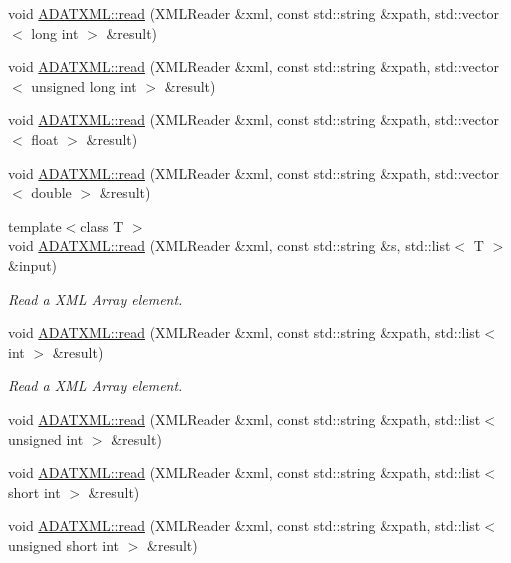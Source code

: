 \begin{DoxyCompactItemize}
\item 
void \mbox{\hyperlink{group__io_gaad4f8586d1c41ae7f0c32a40754623f5}{A\+D\+A\+T\+X\+M\+L\+::read}} (X\+M\+L\+Reader \&xml, const std\+::string \&xpath, std\+::vector$<$ long int $>$ \&result)
\item 
void \mbox{\hyperlink{group__io_ga04a1d8c6fa265cdf5824019b4f94844f}{A\+D\+A\+T\+X\+M\+L\+::read}} (X\+M\+L\+Reader \&xml, const std\+::string \&xpath, std\+::vector$<$ unsigned long int $>$ \&result)
\item 
void \mbox{\hyperlink{group__io_ga161a35ac40c7f85342a454fbc17e2dad}{A\+D\+A\+T\+X\+M\+L\+::read}} (X\+M\+L\+Reader \&xml, const std\+::string \&xpath, std\+::vector$<$ float $>$ \&result)
\item 
void \mbox{\hyperlink{group__io_ga49fa13abbc0b2a2273c58d328d1e7d70}{A\+D\+A\+T\+X\+M\+L\+::read}} (X\+M\+L\+Reader \&xml, const std\+::string \&xpath, std\+::vector$<$ double $>$ \&result)
\item 
{\footnotesize template$<$class T $>$ }\\void \mbox{\hyperlink{group__io_gacca340ef5b3a2ee3626cb544539f5e64}{A\+D\+A\+T\+X\+M\+L\+::read}} (X\+M\+L\+Reader \&xml, const std\+::string \&s, std\+::list$<$ T $>$ \&input)
\begin{DoxyCompactList}\small\item\em Read a X\+ML Array element. \end{DoxyCompactList}\item 
void \mbox{\hyperlink{group__io_gab7d805fe66e6e3f1f897d4dabd3b29ad}{A\+D\+A\+T\+X\+M\+L\+::read}} (X\+M\+L\+Reader \&xml, const std\+::string \&xpath, std\+::list$<$ int $>$ \&result)
\begin{DoxyCompactList}\small\item\em Read a X\+ML Array element. \end{DoxyCompactList}\item 
void \mbox{\hyperlink{group__io_gab76dffc06569f27474fb03e08b372393}{A\+D\+A\+T\+X\+M\+L\+::read}} (X\+M\+L\+Reader \&xml, const std\+::string \&xpath, std\+::list$<$ unsigned int $>$ \&result)
\item 
void \mbox{\hyperlink{group__io_gaf316ff420b43fcc4c23590001af57c66}{A\+D\+A\+T\+X\+M\+L\+::read}} (X\+M\+L\+Reader \&xml, const std\+::string \&xpath, std\+::list$<$ short int $>$ \&result)
\item 
void \mbox{\hyperlink{group__io_ga6a4f6e0bca990676d09efaf318ed8eb7}{A\+D\+A\+T\+X\+M\+L\+::read}} (X\+M\+L\+Reader \&xml, const std\+::string \&xpath, std\+::list$<$ unsigned short int $>$ \&result)

\end{DoxyCompactItemize}

